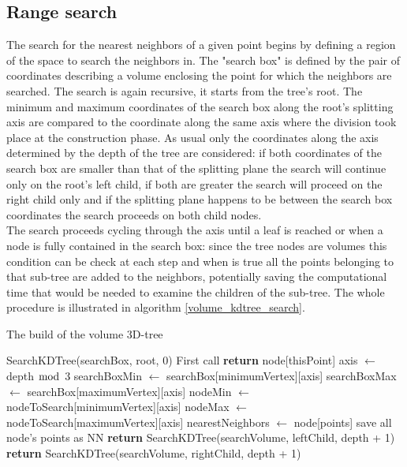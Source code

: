 \subsection{Range search}
The search for the nearest neighbors of a given point begins by defining a region of the space to search the neighbors in.
The "search box" is defined by the pair of coordinates describing a volume enclosing the point for which the neighbors are searched. The search is again recursive, it starts from the tree's root. The minimum and maximum coordinates of the search box along the root's splitting axis are compared to the coordinate along the same axis where the division took place at the construction phase. As usual only the coordinates along the axis determined by the depth of the tree are considered: if both coordinates of the search box are smaller than that of the splitting plane the search will continue only on the root's left child, if both are greater the search will proceed on the right child only and if the splitting plane happens to be between the search box coordinates the search proceeds on both child nodes.\\
The search proceeds cycling through the axis until a leaf is reached or when a node is fully contained in the search box: since the tree nodes are volumes this condition can be check at each step and when is true all the points belonging to that sub-tree are added to the neighbors, potentially saving the computational time that would be needed to examine the children of the sub-tree. The whole procedure is illustrated in algorithm \ref{volume_kdtree_search}.\\
\begin{algorithm}
\caption{The build of the volume 3D-tree}
\label{volume_kdtree_search}
\begin{algorithmic}
\State SearchKDTree(searchBox, root, 0) \Comment First call
    \State \textbf{return} node[thisPoint]
  \EndIf
  \State axis $\gets$ depth $\bmod$ 3
  \State searchBoxMin $\gets$ searchBox[minimumVertex][axis]
  \State searchBoxMax $\gets$ searchBox[maximumVertex][axis]
  \State nodeMin $\gets$ nodeToSearch[minimumVertex][axis]
  \State nodeMax $\gets$ nodeToSearch[maximumVertex][axis]
  \State nearestNeighbors $\gets$ node[points] \Comment save all node's points as NN
  \Else
  	  \State \textbf{return} SearchKDTree(searchVolume, leftChild, depth + 1)
  	\EndIf
 	  \State \textbf{return} SearchKDTree(searchVolume, rightChild, depth + 1)
	\EndIf
  \EndIf
\EndProcedure
\end{algorithmic}
\end{algorithm}

